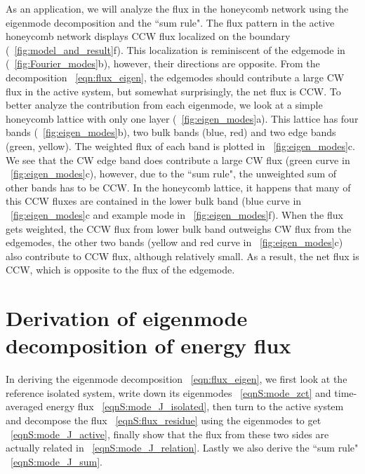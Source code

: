 \documentclass[
 amsmath,amssymb,
 aps,
 pre,
 longbibliography,
 10pt, onecolumn,
 notitlepage
]{revtex4-1}
\begin{document}
As an application, we will analyze the flux in the honeycomb network using the eigenmode decomposition and the ``sum rule".
The flux pattern in the active honeycomb network displays CCW flux localized on the boundary (\figurename~\ref{fig:model_and_result}f). This localization is reminiscent of the edgemode in \cite{Nash2015TopologicalMechanics} (\figurename~\ref{fig:Fourier_modes}b), however, their directions are opposite.
From the decomposition \eqnname~\eqref{eqn:flux_eigen}, the edgemodes should contribute a large CW flux in the active system, but somewhat surprisingly, the net flux is CCW.
To better analyze the contribution from each eigenmode, we look at a simple honeycomb lattice with only one layer (\figurename~\ref{fig:eigen_modes}a).
This lattice has four bands (\figurename~\ref{fig:eigen_modes}b), two bulk bands (blue, red) and two edge bands (green, yellow). The weighted flux of each band is plotted in \figurename~\ref{fig:eigen_modes}c. We see that the CW edge band does contribute a large CW flux (green curve in \figurename~\ref{fig:eigen_modes}c), however, due to the ``sum rule", the unweighted sum of other bands has to be CCW. In the honeycomb lattice, it happens that many of this CCW fluxes are contained in the lower bulk band (blue curve in \figurename~\ref{fig:eigen_modes}c and example mode in \figurename~\ref{fig:eigen_modes}f). When the flux gets weighted, the CCW flux from lower bulk band outweighs CW flux from the edgemodes, the other two bands (yellow and red curve in \figurename~\ref{fig:eigen_modes}c) also contribute to CCW flux, although relatively small. As a result, the net flux is CCW, which is opposite to the flux of the edgemode.


\section{Derivation of eigenmode decomposition of energy flux}
In deriving the eigenmode decomposition \eqnname~\eqref{eqn:flux_eigen}, we first look at the reference isolated system, write down its eigenmodes \eqnname~\eqref{eqnS:mode_zct} and time-averaged energy flux \eqnname~\eqref{eqnS:mode_J_isolated}, then turn to the active system and decompose the flux \eqnname~\eqref{eqnS:flux_residue} using the eigenmodes to get \eqnname~\eqref{eqnS:mode_J_active}, finally show that the flux from these two sides are actually related in \eqnname~\eqref{eqnS:mode_J_relation}.
Lastly we also derive the ``sum rule" \eqnname~\eqref{eqnS:mode_J_sum}.
\end{document}
